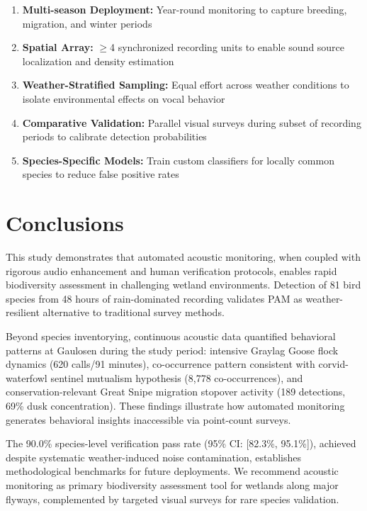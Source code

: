 \documentclass[twocolumn]{article}
\begin{document}
\begin{enumerate}
\item \textbf{Multi-season Deployment:} Year-round monitoring to capture breeding, migration, and winter periods

\item \textbf{Spatial Array:} $\geq$4 synchronized recording units to enable sound source localization and density estimation

\item \textbf{Weather-Stratified Sampling:} Equal effort across weather conditions to isolate environmental effects on vocal behavior

\item \textbf{Comparative Validation:} Parallel visual surveys during subset of recording periods to calibrate detection probabilities

\item \textbf{Species-Specific Models:} Train custom classifiers for locally common species to reduce false positive rates
\end{enumerate}

\section{Conclusions}

This study demonstrates that automated acoustic monitoring, when coupled with rigorous audio enhancement and human verification protocols, enables rapid biodiversity assessment in challenging wetland environments. Detection of 81 bird species from 48 hours of rain-dominated recording validates PAM as weather-resilient alternative to traditional survey methods.

Beyond species inventorying, continuous acoustic data quantified behavioral patterns at Gaulosen during the study period: intensive Graylag Goose flock dynamics (620 calls/91 minutes), co-occurrence pattern consistent with corvid-waterfowl sentinel mutualism hypothesis (8,778 co-occurrences), and conservation-relevant Great Snipe migration stopover activity (189 detections, 69\% dusk concentration). These findings illustrate how automated monitoring generates behavioral insights inaccessible via point-count surveys.

The 90.0\% species-level verification pass rate (95\% CI: [82.3\%, 95.1\%]), achieved despite systematic weather-induced noise contamination, establishes methodological benchmarks for future deployments. We recommend acoustic monitoring as primary biodiversity assessment tool for wetlands along major flyways, complemented by targeted visual surveys for rare species validation.
\end{document}
